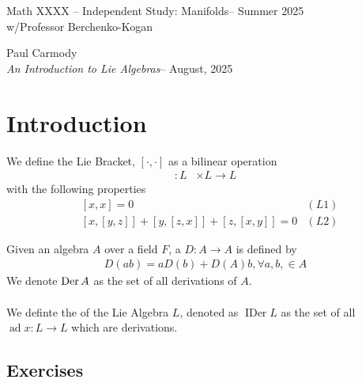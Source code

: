 \documentclass[12pt,a4paper]{report}
\newcommand{\CLASSNAME}{Math XXXX -- Independent Study: Manifolds}
\newcommand{\STUDENTNAME}{Paul Carmody}
\newcommand{\ASSIGNMENT}{\textit{An Introduction to Lie Algebras}}
\newcommand{\DUEDATE}{August, 2025}
\newcommand{\PROFESSOR}{Professor Berchenko-Kogan}
\newcommand{\SEMESTER}{Summer 2025}
\newcommand{\AD}{\operatorname{ad}}
\newcommand{\IDER}{\operatorname{IDer}}
\begin{document}
\begin{center}
	\Large{\CLASSNAME -- \SEMESTER} \\
	\large{ w/\PROFESSOR}
\end{center}
\begin{center}
	\STUDENTNAME \\
	\ASSIGNMENT -- \DUEDATE\\
\end{center} 

\chapter{Introduction}

\begin{definition}

We define the Lie Bracket, $[\cdot, \cdot]$ as a bilinear operation
\begin{align*}
	[\cdot,\cdot] : L &\times L \to L
\end{align*}with the following properties
\begin{align*}
	&[x,x] =0 & (L1)\\
	&[x, [y,z]] + [y, [z,x]] + [z, [x,y]] =0 & (L2)
\end{align*}
\end{definition}

\begin{definition}[Derivation of $A$]

Given an algebra $A$ over a field $F$, a  $D: A \to A$ is defined by 
\begin{align*}
	D(ab) = aD(b)+D(A)b, \forall a,b, \in A
\end{align*}We denote $\operatorname{Der} A$ as the set of all derivations of $A$.\\ \\

We definte the  of the Lie Algebra $L$, denoted as $\IDER L$ as the set of all $\AD x: L \to L$ which are derivations.
\end{definition}


\section{Exercises}
\end{document}
